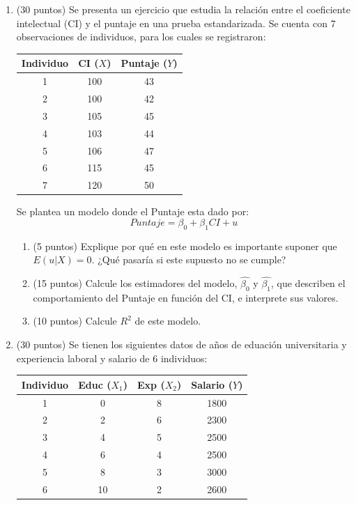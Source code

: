 \documentclass[10pt,a4paper]{article}
\begin{document}
\begin{enumerate}
\item (30 puntos) Se presenta un ejercicio que estudia la relación entre el coeficiente intelectual (CI) y el puntaje en una prueba estandarizada. Se cuenta con 7 observaciones de individuos, para los cuales se registraron:

\begin{center}
\begin{tabular}{|c|c|c|}
\hline
\textbf{Individuo} & \textbf{CI} ($X$) & \textbf{Puntaje} ($Y$)\\
\hline
1 & 100  & 43 \\
2 & 100 & 42 \\
3 & 105 & 45 \\
4 & 103 & 44 \\
5 & 106 & 47 \\
6 & 115 & 45 \\
7 & 120 & 50 \\
\hline
\end{tabular}
\end{center}

Se plantea un modelo donde el Puntaje esta dado por:
$$Puntaje = \beta_0 + \beta_1 CI + u$$

\begin{enumerate}
    \item (5 puntos) Explique por qué en este modelo es importante suponer que $E(u|X)=0$. ¿Qué pasaría si este supuesto no se cumple?

    \item (15 puntos) Calcule los estimadores del modelo, $\hat{\beta_0}$ y $\hat{\beta_1}$, que describen el comportamiento del Puntaje en función del CI, e interprete sus valores.

    \item (10 puntos) Calcule $R^2$ de este modelo.\\

\end{enumerate}

\item (30 puntos) Se tienen los siguientes datos de años de eduación universitaria y experiencia laboral y salario de 6 individuos:
\begin{center}
\begin{tabular}{|c|c|c|c|}
\hline
\textbf{Individuo} & \textbf{Educ} ($X_1$) & \textbf{Exp} ($X_2$)  & \textbf{Salario ($Y$)}\\
\hline
1 & 0 & 8 & 1800 \\
2 & 2 & 6 & 2300 \\
3 & 4 & 5 & 2500 \\
4 & 6 & 4 & 2500 \\
5 & 8 & 3 & 3000 \\
6 & 10 & 2 & 2600 \\
\hline
\end{tabular}
\end{center}


\end{enumerate}
\end{document}
